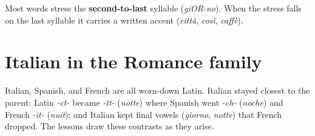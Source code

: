 Most words stress the \textbf{second-to-last} syllable (\emph{giOR-no}). When the stress falls on the last syllable it carries a written accent (\emph{città}, \emph{così}, \emph{caffè}).

\section*{Italian in the Romance family}

Italian, Spanish, and French are all worn-down Latin. Italian stayed closest to the parent: Latin \emph{-ct-} became \emph{-tt-} (\emph{notte}) where Spanish went \emph{-ch-} (\emph{noche}) and French \emph{-it-} (\emph{nuit}); and Italian kept final vowels (\emph{giorno}, \emph{notte}) that French dropped. The lessons draw these contrasts as they arise.
